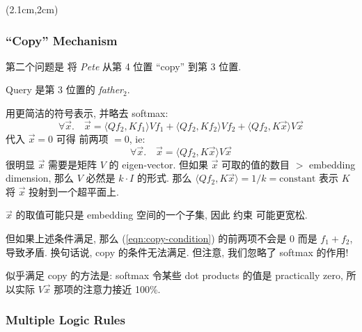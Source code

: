\begin{preview}
\begin{minipage}{\textwidth}
	
\setlength{\parskip}{0.4\baselineskip}
\begin{textblock*}{20cm}(2.1cm,2cm) %
	{}
	\hspace{8cm}
\end{textblock*}

\vspace*{0.3cm} 

\subsubsection{``Copy'' Mechanism}

第二个问题是 将 \textit{Pete} 从第 4 位置 ``copy'' 到第 3 位置.

Query 是第 3 位置的 \textit{father}$_2$.

用更简洁的符号表示, 并略去 softmax:
\begin{equation}
\forall \vec{x}. \quad \vec{x} = \langle Q f_2, K f_1 \rangle V f_1 + \langle Q f_2, K f_2 \rangle V f_2 + \langle Q f_2, K \vec{x} \rangle V \vec{x}
\label{eqn:copy-condition}
\end{equation}
代入 $\vec{x} = 0$ 可得 前两项 $= 0$, ie:
\begin{equation}
\forall \vec{x}. \quad \vec{x} = \langle Q f_2, K \vec{x} \rangle V \vec{x}
\end{equation}
很明显 $\vec{x}$ 需要是矩阵 $V$ 的 eigen-vector.  但如果 $\vec{x}$ 可取的值的数目 $>$ embedding dimension, 那么 $V$ 必然是 $k \cdot I$ 的形式.  那么 $\langle Q f_2, K \vec{x} \rangle = 1/k = \mbox{constant}$ 表示 $K$ 将 $\vec{x}$ 投射到一个超平面上.

$\vec{x}$ 的取值可能只是 embedding 空间的一个子集, 因此 约束 可能更宽松.

但如果上述条件满足, 那么 (\ref{eqn:copy-condition}) 的前两项不会是 0 而是 $f_1 + f_2$, 导致矛盾.  换句话说, copy 的条件无法满足.  但注意, 我们忽略了 softmax 的作用!

似乎满足 copy 的方法是: softmax 令某些 dot products 的值是 practically zero, 所以实际 $V \vec{x}$ 那项的注意力接近 100\%.

\subsubsection{Multiple Logic Rules}


\end{minipage}
\end{preview}
